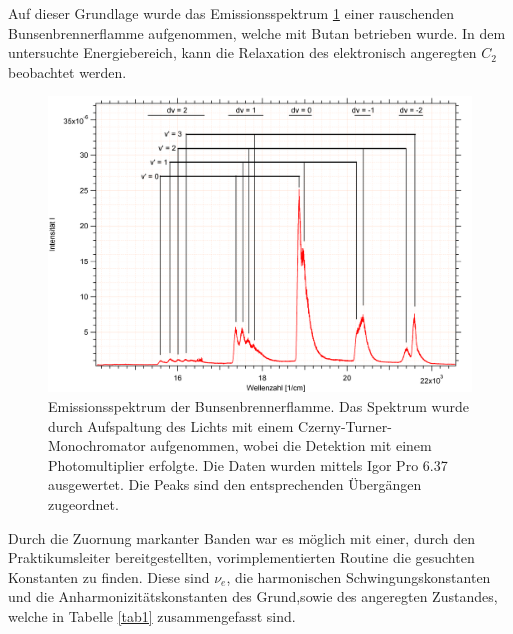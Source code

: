 Auf dieser Grundlage wurde das Emissionsspektrum \ref{Bunsen} einer rauschenden Bunsenbrennerflamme aufgenommen, welche mit Butan betrieben wurde. In dem untersuchte Energiebereich, kann die Relaxation des elektronisch angeregten $C_2$ beobachtet werden.



\begin{figure}[H]
	\centering	
	\begin{minipage}{1\textwidth}
	\includegraphics[width=\columnwidth]{Bilder/Graph3.png}
	\end{minipage}
	
	
	\caption{Emissionsspektrum der Bunsenbrennerflamme. Das Spektrum wurde durch Aufspaltung des Lichts mit einem Czerny-Turner-Monochromator aufgenommen, wobei die Detektion mit einem Photomultiplier erfolgte. Die Daten wurden mittels Igor Pro 6.37 ausgewertet. Die Peaks sind den entsprechenden Übergängen zugeordnet.}
	

	\label{Bunsen}
\end{figure}

Durch die Zuornung  markanter Banden war es möglich mit einer, durch den Praktikumsleiter bereitgestellten, vorimplementierten Routine die gesuchten Konstanten zu finden.\cite{S10} Diese sind  $\nu_e$, die harmonischen Schwingungskonstanten und die Anharmonizitätskonstanten des Grund,sowie des angeregten Zustandes, welche in Tabelle  \ref{tab1} zusammengefasst sind.


